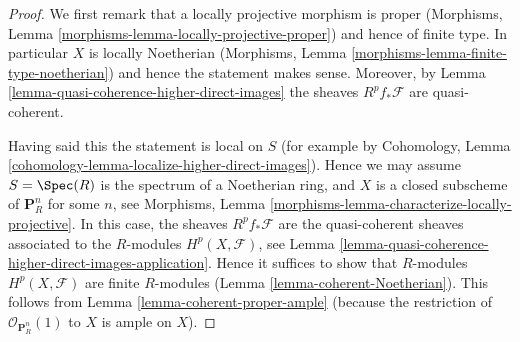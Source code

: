 \begin{proof}
We first remark that a locally projective morphism is proper
(Morphisms, Lemma \ref{morphisms-lemma-locally-projective-proper})
and hence of finite type.
In particular $X$ is locally Noetherian
(Morphisms, Lemma \ref{morphisms-lemma-finite-type-noetherian})
and hence the statement makes sense.
Moreover, by Lemma \ref{lemma-quasi-coherence-higher-direct-images}
the sheaves $R^pf_*\mathcal{F}$ are quasi-coherent.

\medskip\noindent
Having said this the statement is local on $S$ (for example by
Cohomology, Lemma \ref{cohomology-lemma-localize-higher-direct-images}).
Hence we may assume $S = \Spec(R)$ is the spectrum of
a Noetherian ring, and $X$ is a closed subscheme of
$\mathbf{P}^n_R$ for some $n$, see
Morphisms, Lemma \ref{morphisms-lemma-characterize-locally-projective}.
In this case, the sheaves $R^pf_*\mathcal{F}$ are the quasi-coherent
sheaves associated to the $R$-modules $H^p(X, \mathcal{F})$, see
Lemma \ref{lemma-quasi-coherence-higher-direct-images-application}.
Hence it suffices to show that $R$-modules $H^p(X, \mathcal{F})$
are finite $R$-modules (Lemma \ref{lemma-coherent-Noetherian}).
This follows from Lemma \ref{lemma-coherent-proper-ample}
(because the restriction of $\mathcal{O}_{\mathbf{P}^n_R}(1)$
to $X$ is ample on $X$).
\end{proof}








